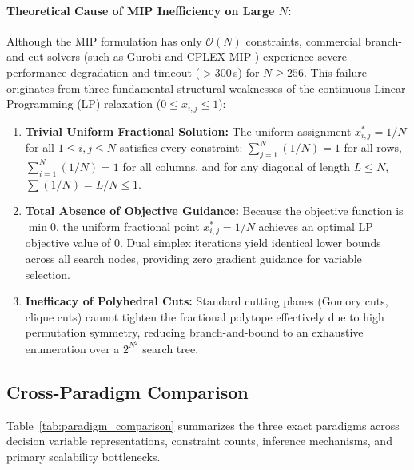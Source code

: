 \documentclass[a4paper,fleqn]{cas-sc}
\begin{document}
\paragraph{Theoretical Cause of MIP Inefficiency on Large $N$:}
Although the MIP formulation has only $\mathcal{O}(N)$ constraints, commercial branch-and-cut solvers (such as Gurobi \cite{gurobi2025} and CPLEX MIP \cite{ibm2022cplex}) experience severe performance degradation and timeout ($> 300$\,s) for $N \ge 256$. This failure originates from three fundamental structural weaknesses of the continuous Linear Programming (LP) relaxation ($0 \le x_{i,j} \le 1$):
\begin{enumerate}
    \item \textbf{Trivial Uniform Fractional Solution:} The uniform assignment $x_{i,j}^* = 1/N$ for all $1 \le i, j \le N$ satisfies every constraint: $\sum_{j=1}^N (1/N) = 1$ for all rows, $\sum_{i=1}^N (1/N) = 1$ for all columns, and for any diagonal of length $L \le N$, $\sum (1/N) = L/N \le 1$.
    \item \textbf{Total Absence of Objective Guidance:} Because the objective function is $\min 0$, the uniform fractional point $x_{i,j}^* = 1/N$ achieves an optimal LP objective value of 0. Dual simplex iterations yield identical lower bounds across all search nodes, providing zero gradient guidance for variable selection.
    \item \textbf{Inefficacy of Polyhedral Cuts:} Standard cutting planes (Gomory cuts, clique cuts) cannot tighten the fractional polytope effectively due to high permutation symmetry, reducing branch-and-bound to an exhaustive enumeration over a $2^{N^2}$ search tree.
\end{enumerate}

\subsection{Cross-Paradigm Comparison}
\label{subsec:paradigm_comparison}
Table~\ref{tab:paradigm_comparison} summarizes the three exact paradigms across decision variable representations, constraint counts, inference mechanisms, and primary scalability bottlenecks.
\end{document}
